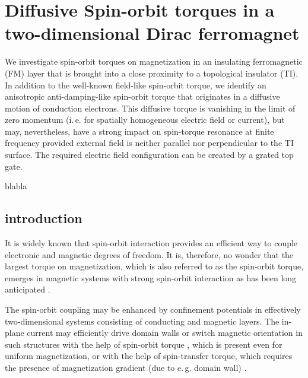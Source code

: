 \chapter{Diffusive Spin-orbit torques in a two-dimensional Dirac ferromagnet}
We investigate spin-orbit torques on magnetization in an insulating ferromagnetic (FM) layer that is brought into a close proximity to a topological insulator (TI). In addition to the well-known field-like spin-orbit torque, we identify an anisotropic anti-damping-like spin-orbit torque that originates in a diffusive motion of conduction electrons. This diffusive torque is vanishing in the limit of zero momentum (i.\,e. for spatially homogeneous electric field or current), but may, nevertheless, have a strong impact on spin-torque resonance at finite frequency provided external field is neither parallel nor perpendicular to the TI surface. The required electric field configuration can be created by a grated top gate.

\vfill
blabla
\clearpage

\section{introduction}
It is widely known that spin-orbit interaction provides an efficient way to couple electronic and magnetic degrees of freedom. It is, therefore, no wonder that the largest torque on magnetization, which is also referred to as the spin-orbit torque, emerges in magnetic systems with strong spin-orbit interaction \cite{miron_current-driven_2010,haney_current_2013} as has been long anticipated \cite{dyakonov_current-induced_1971}. 

The spin-orbit coupling may be enhanced by confinement potentials in effectively two-dimensional systems consisting of conducting and magnetic layers. The in-plane current may efficiently drive domain walls or switch magnetic orientation in such structures with the help of spin-orbit torque \cite{awschalom2009trend,manchon_theory_2008,garate_influence_2009,manchon2009theory}, which is present even for uniform magnetization, or with the help of spin-transfer torque, which requires the presence of magnetization gradient (due to e.\,g. domain wall) \cite{slonczewski_current-driven_1996,berger_emission_1996,ralph_spin_2008,stiles_anatomy_2002}. 

